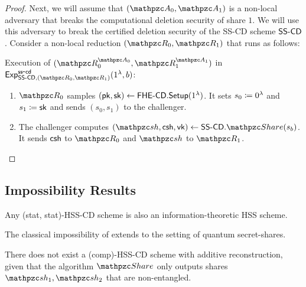\begin{proof}
Next, we will assume that $(\qA_0, \qA_1)$ is a non-local adversary
that breaks the computational deletion security of share $1$. We
will use this adversary to break the certified deletion security of
the SS-CD scheme $\mathsf{SS\textrm{-}CD}$. Consider a non-local reduction $(\qR_0,
\qR_1)$ that runs as follows:

\begin{description}
\item Execution of $(\qR_0^{\qA_0}, \qR_1^{\qA_1})$ in
$\expb{\SScd,(\qR_0, \qR_1)}{ss}{cd}(1^\secp,b)$:
\begin{enumerate}
\item $\qR_0$ samples $(\mathsf{pk}, \mathsf{sk}) \leftarrow
\mathsf{FHE\textrm{-}CD}.\mathsf{Setup}(1^\lambda)$. It sets $s_0 \coloneqq 0^\lambda$ and $s_1
\coloneqq \mathsf{sk}$ and sends $(s_0, s_1)$ to the challenger.
\item The challenger computes $(\qsh, \csh, \vk) \leftarrow
\SScd.\Sh(s_b)$. It sends $\mathsf{csh}$ to $\qR_0$ and $\qsh$ to $\qR_1$.

\end{enumerate}
\end{description}
\end{proof}

\subsection{Impossibility Results}

\begin{theorem}
Any (stat, stat)-HSS-CD scheme is also an information-theoretic HSS
scheme.
\end{theorem}

\begin{theorem}
The classical impossibility of \cite{} extends to the setting of
quantum secret-shares.
\end{theorem}

\begin{theorem}
There does not exist a (comp)-HSS-CD scheme with additive
reconstruction, given that the algorithm $\Sh$ only outputs shares
$\qsh_1, \qsh_2$ that are non-entangled.
\end{theorem}

\cite{C:GorVaiWee12}
